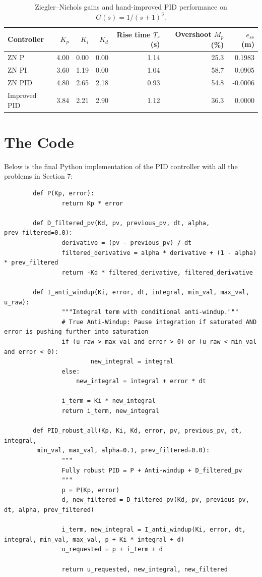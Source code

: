 \documentclass[10pt]{article}
\begin{document}
	\begin{table}[h]
		\centering
		\small
		\begin{tabular}{@{}lrrrrrr@{}}
			\toprule
			Controller & $K_p$ & $K_i$ & $K_d$ & Rise time $T_r$ (s) & Overshoot $M_p$ (\%) & $e_{ss}$ (m) \\
			\midrule
			ZN P         & 4.00 & 0.00 & 0.00 & 1.14 & 25.3 & 0.1983 \\
			ZN PI        & 3.60 & 1.19 & 0.00 & 1.04 & 58.7 & 0.0905 \\
			ZN PID       & 4.80 & 2.65 & 2.18 & 0.93 & 54.8 & -0.0006 \\
			\midrule
			Improved PID & 3.84 & 2.21 & 2.90 & 1.12 & 36.3 & 0.0000 \\
			\bottomrule
		\end{tabular}
		\caption{Ziegler--Nichols gains and hand-improved PID performance on $G(s) = 1/(s+1)^3$.}
		\label{tab:zn_results}
	\end{table}
	

	
	\section{The Code}
	Below is the final Python implementation of the PID controller with all the problems in Section 7:
	
	\begin{verbatim}
		def P(Kp, error):
				return Kp * error
		
		def D_filtered_pv(Kd, pv, previous_pv, dt, alpha, prev_filtered=0.0):
				derivative = (pv - previous_pv) / dt
				filtered_derivative = alpha * derivative + (1 - alpha) * prev_filtered
				return -Kd * filtered_derivative, filtered_derivative
		
		def I_anti_windup(Ki, error, dt, integral, min_val, max_val, u_raw):
				"""Integral term with conditional anti-windup."""
				# True Anti-Windup: Pause integration if saturated AND error is pushing further into saturation
				if (u_raw > max_val and error > 0) or (u_raw < min_val and error < 0):
						new_integral = integral
				else:
					new_integral = integral + error * dt
		
				i_term = Ki * new_integral
				return i_term, new_integral
		
		def PID_robust_all(Kp, Ki, Kd, error, pv, previous_pv, dt, integral,
		 min_val, max_val, alpha=0.1, prev_filtered=0.0):
				"""
				Fully robust PID = P + Anti-windup + D_filtered_pv
				"""
				p = P(Kp, error)
				d, new_filtered = D_filtered_pv(Kd, pv, previous_pv, dt, alpha, prev_filtered)
			
				i_term, new_integral = I_anti_windup(Ki, error, dt, integral, min_val, max_val, p + Ki * integral + d)
				u_requested = p + i_term + d
		
				return u_requested, new_integral, new_filtered
	\end{verbatim}
	
\end{document}
